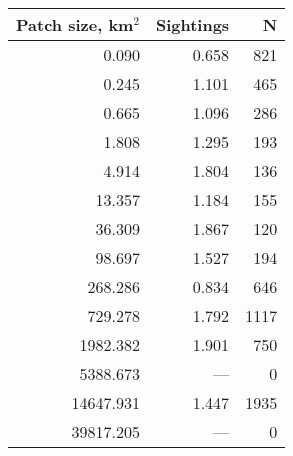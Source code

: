 \begin{tabular}{rrr}
\toprule
 Patch size, km$^2$ &  Sightings &    N \\
\midrule
              0.090 &      0.658 &  821 \\
              0.245 &      1.101 &  465 \\
              0.665 &      1.096 &  286 \\
              1.808 &      1.295 &  193 \\
              4.914 &      1.804 &  136 \\
             13.357 &      1.184 &  155 \\
             36.309 &      1.867 &  120 \\
             98.697 &      1.527 &  194 \\
            268.286 &      0.834 &  646 \\
            729.278 &      1.792 & 1117 \\
           1982.382 &      1.901 &  750 \\
           5388.673 &        --- &    0 \\
          14647.931 &      1.447 & 1935 \\
          39817.205 &        --- &    0 \\
\bottomrule
\end{tabular}
